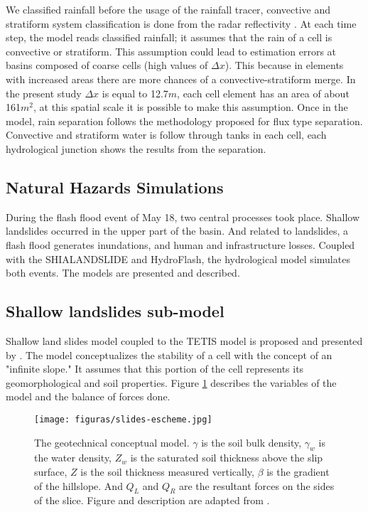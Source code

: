 {We classified rainfall before the usage of the rainfall tracer, convective and stratiform system classification is done from the radar reflectivity \citep{Steiner1995}. At each time step, the model reads classified rainfall; it assumes that the rain of a cell is convective or stratiform.  This assumption could lead to estimation errors at basins composed of coarse cells (high values of $\Delta x$). This because in elements with increased areas there are more chances of a convective-stratiform merge.  In the present study $\Delta x$ is equal to 12.7$m$, each cell element has an area of about 161$m^2$, at this spatial scale it is possible to make this assumption.  Once in the model, rain separation follows the methodology proposed for flux type separation. Convective and stratiform water is follow through tanks in each cell, each hydrological junction shows the results from the separation.\\

\subsection{Natural Hazards Simulations}

During the flash flood event of May 18, two central processes took place. Shallow landslides occurred in the upper part of the basin.  And related to landslides, a flash flood generates inundations, and human and infrastructure losses.  Coupled with the SHIALANDSLIDE and HydroFlash, the hydrological model simulates both events.  The models are presented and described.\\

\subsection{Shallow landslides sub-model}

Shallow land slides model coupled to the TETIS model is proposed and presented by  \citeauthor{Aristizabal2016}.  The model conceptualizes the stability of a cell with the concept of an "infinite slope." It assumes that this portion of the cell represents its geomorphological and soil properties. Figure \ref{fig:ModeloEstabilidad} describes the variables of the model and the balance of forces done.  

\begin{figure}[t]
\centering
 \texttt{[image: figuras/slides-escheme.jpg]}
 \caption{The geotechnical conceptual model. $\gamma$ is the soil bulk density, $\gamma_w$ is the water density, $Z_w$ is the saturated soil thickness above the slip surface, $Z$ is the soil
thickness measured vertically, $\beta$ is the gradient of the hillslope. And $Q_L$ and $Q_R$ are the resultant forces on the sides of the slice.  Figure and description are adapted from \citet{Aristizabal2016}.}
    \label{fig:ModeloEstabilidad}
\end{figure}

}
